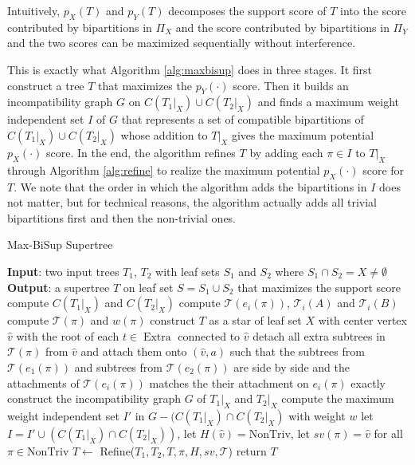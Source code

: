 \documentclass[twocolumn]{bmcart}%
\newcommand{\triv}{\mathrm{Triv}}
\newcommand{\ntriv}{\mathrm{NonTriv}}
\DeclareMathOperator*{\extra}{Extra}
\theoremstyle{mystyle}
\theoremstyle{proofstyle}
\begin{document}
Intuitively, $p_X(T)$ and $p_Y(T)$ decomposes the support score of $T$ into the score contributed by bipartitions in $\Pi_X$ and the score contributed by bipartitions in $\Pi_Y$ and the two scores can be maximized sequentially without interference. 

This is exactly what Algorithm \ref{alg:maxbisup} does in three stages. It first construct a tree $T$ that maximizes the $p_Y(\cdot)$ score. Then it builds an incompatibility graph $G$ on $C(T_1|_X) \cup C(T_2|_X)$ and finds a maximum weight independent set $I$ of $G$ that represents a set of compatible bipartitions of $C(T_1|_X) \cup C(T_2|_X)$ whose addition to $T|_X$ gives the maximum potential $p_X(\cdot)$ score. In the end, the algorithm refines $T$ by adding each $\pi \in I$ to $T|_X$ through Algorithm \ref{alg:refine} to realize the maximum potential $p_X(\cdot)$ score for $T$. We note that the order in which the algorithm adds the bipartitions in $I$ does not matter, but for technical reasons, the algorithm actually adds all trivial bipartitions first and then the non-trivial ones.


\begin{algorithm}
    \caption{Max-BiSup Supertree}%
    \label{alg:maxbisup}
    \begin{algorithmic}[1]
        \Statex \textbf{Input}: two input trees $T_1$, $T_2$ with leaf sets $S_1$ and $S_2$ where $S_1 \cap S_2 = X \neq \emptyset$ 
        \Statex \textbf{Output}: a supertree $T$ on leaf set $S = S_1 \cup S_2$ that maximizes the support score
        \State compute $C(T_1|_X)$ and $C(T_2|_X)$
                \State compute $\mathcal{T}(e_i(\pi))$, $\mathcal{T}_i(A)$ and $\mathcal{T}_i(B)$
            \EndFor
            \State compute $\mathcal{T}(\pi)$ and $w(\pi)$
        \EndFor
        \State construct $T$ as a star of leaf set $X$ with center vertex $\hat{v}$ with the root of each $t \in \extra$ connected to $\hat{v}$         
        \For{each $\pi = \{a\}|B \in \triv$}
            \State detach all extra subtrees in $\mathcal{T}(\pi)$ from $\hat{v}$ and attach them onto $(\hat{v},a)$ such that the subtrees from $\mathcal{T}(e_1(\pi))$ and subtrees from $\mathcal{T}(e_2(\pi))$ are side by side and the attachments of $\mathcal{T}(e_i(\pi))$ matches the their attachment on $e_i(\pi)$ exactly
        \EndFor {}
        \State construct the incompatibility graph $G$ of $T_1|_X$ and $T_2|_X$ 
        \State compute the maximum weight independent set $I'$ in $G - (C(T_1|_X) \cap C(T_2|_X)$ with weight $w$
        \State let $I = I' \cup (C(T_1|_X) \cap C(T_2|_X))$, let $H(\hat{v}) = \ntriv $, let $sv(\pi) = \hat{v}$ for all $\pi \in \ntriv$
        \For{each $\pi \in \ntriv \cap I$}
            \State $T \gets $ Refine($T_1,T_2, T, \pi, H, sv, \mathcal{T}$) 
        \EndFor {}
        \State return $T$
    \end{algorithmic}
\end{algorithm}
\end{document}
